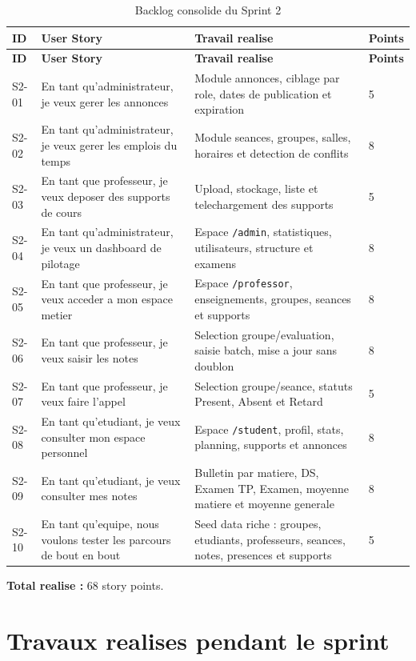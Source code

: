 \documentclass[12pt,a4paper]{report}
\begin{document}
\begin{longtable}{|p{1.6cm}|p{5.3cm}|p{5.4cm}|p{1.4cm}|}
\caption{Backlog consolide du Sprint 2}\\
\hline
\textbf{ID} & \textbf{User Story} & \textbf{Travail realise} & \textbf{Points} \\
\hline
\endfirsthead
\hline
\textbf{ID} & \textbf{User Story} & \textbf{Travail realise} & \textbf{Points} \\
\hline
\endhead
S2-01 & En tant qu'administrateur, je veux gerer les annonces & Module annonces, ciblage par role, dates de publication et expiration & 5 \\
\hline
S2-02 & En tant qu'administrateur, je veux gerer les emplois du temps & Module seances, groupes, salles, horaires et detection de conflits & 8 \\
\hline
S2-03 & En tant que professeur, je veux deposer des supports de cours & Upload, stockage, liste et telechargement des supports & 5 \\
\hline
S2-04 & En tant qu'administrateur, je veux un dashboard de pilotage & Espace \texttt{/admin}, statistiques, utilisateurs, structure et examens & 8 \\
\hline
S2-05 & En tant que professeur, je veux acceder a mon espace metier & Espace \texttt{/professor}, enseignements, groupes, seances et supports & 8 \\
\hline
S2-06 & En tant que professeur, je veux saisir les notes & Selection groupe/evaluation, saisie batch, mise a jour sans doublon & 8 \\
\hline
S2-07 & En tant que professeur, je veux faire l'appel & Selection groupe/seance, statuts Present, Absent et Retard & 5 \\
\hline
S2-08 & En tant qu'etudiant, je veux consulter mon espace personnel & Espace \texttt{/student}, profil, stats, planning, supports et annonces & 8 \\
\hline
S2-09 & En tant qu'etudiant, je veux consulter mes notes & Bulletin par matiere, DS, Examen TP, Examen, moyenne matiere et moyenne generale & 8 \\
\hline
S2-10 & En tant qu'equipe, nous voulons tester les parcours de bout en bout & Seed data riche : groupes, etudiants, professeurs, seances, notes, presences et supports & 5 \\
\hline
\end{longtable}

\textbf{Total realise :} 68 story points.

\section{Travaux realises pendant le sprint}
\end{document}
